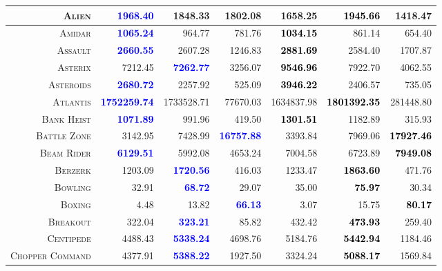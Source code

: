 \documentclass{article}
\begin{document}
{\begin{table}
{\begin{tabular}{|r|r|r|r||r|r|r|}
\textsc{Alien} & \textbf{\textcolor{blue}{1968.40}} & 1848.33 & 1802.08  & 1658.25 & \textbf{\textcolor{black}{1945.66}} & 1418.47  \\
\hline
\textsc{Amidar} & \textbf{\textcolor{blue}{1065.24}} & 964.77 & 781.76  & \textbf{\textcolor{black}{1034.15}} & 861.14 & 654.40  \\
\hline
\textsc{Assault} & \textbf{\textcolor{blue}{2660.55}} & 2607.28 & 1246.83  & \textbf{\textcolor{black}{2881.69}} & 2584.40 & 1707.87  \\
\hline
\textsc{Asterix} & 7212.45 & \textbf{\textcolor{blue}{7262.77}} & 3256.07  & \textbf{\textcolor{black}{9546.96}} & 7922.70 & 4062.55  \\
\hline
\textsc{Asteroids} & \textbf{\textcolor{blue}{2680.72}} & 2257.92 & 525.09  & \textbf{\textcolor{black}{3946.22}} & 2406.57 & 735.05  \\
\hline
\textsc{Atlantis} & \textbf{\textcolor{blue}{1752259.74}} & 1733528.71 & 77670.03  & 1634837.98 & \textbf{\textcolor{black}{1801392.35}} & 281448.80  \\
\hline
\textsc{Bank Heist} & \textbf{\textcolor{blue}{1071.89}} & 991.96 & 419.50  & \textbf{\textcolor{black}{1301.51}} & 1182.89 & 315.93  \\
\hline
\textsc{Battle Zone} & 3142.95 & 7428.99 & \textbf{\textcolor{blue}{16757.88}}  & 3393.84 & 7969.06 & \textbf{\textcolor{black}{17927.46}}  \\
\hline
\textsc{Beam Rider} & \textbf{\textcolor{blue}{6129.51}} & 5992.08 & 4653.24  & 7004.58 & 6723.89 & \textbf{\textcolor{black}{7949.08}}  \\
\hline
\textsc{Berzerk} & 1203.09 & \textbf{\textcolor{blue}{1720.56}} & 416.03  & 1233.47 & \textbf{\textcolor{black}{1863.60}} & 471.76  \\
\hline
\textsc{Bowling} & 32.91 & \textbf{\textcolor{blue}{68.72}} & 29.07  & 35.00 & \textbf{\textcolor{black}{75.97}} & 30.34  \\
\hline
\textsc{Boxing} & 4.48 & 13.82 & \textbf{\textcolor{blue}{66.13}}  & 3.07 & 15.75 & \textbf{\textcolor{black}{80.17}}  \\
\hline
\textsc{Breakout} & 322.04 & \textbf{\textcolor{blue}{323.21}} & 85.82  & 432.42 & \textbf{\textcolor{black}{473.93}} & 259.40  \\
\hline
\textsc{Centipede} & 4488.43 & \textbf{\textcolor{blue}{5338.24}} & 4698.76  & 5184.76 & \textbf{\textcolor{black}{5442.94}} & 1184.46  \\
\hline
\textsc{Chopper Command} & 4377.91 & \textbf{\textcolor{blue}{5388.22}} & 1927.50  & 3324.24 & \textbf{\textcolor{black}{5088.17}} & 1569.84  \\

\end{tabular}}
\end{table}}
\end{document}
